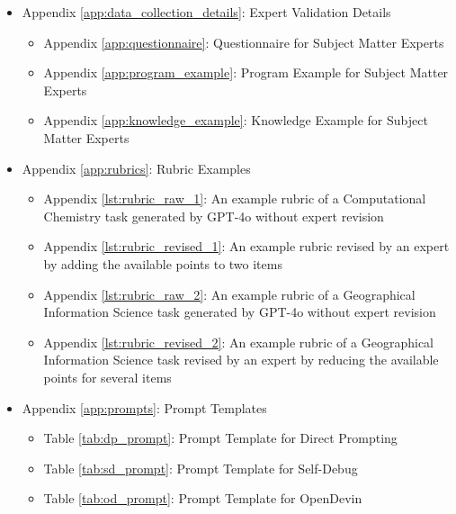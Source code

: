 \begin{itemize}
    \item Appendix \ref{app:data_collection_details}: Expert Validation Details
    \begin{itemize}
        \item Appendix \ref{app:questionnaire}: Questionnaire for Subject Matter Experts
        \item Appendix \ref{app:program_example}: Program Example for Subject Matter Experts
        \item Appendix \ref{app:knowledge_example}: Knowledge Example for Subject Matter Experts \\
    \end{itemize}
    
    \item Appendix \ref{app:rubrics}: Rubric Examples
    \begin{itemize}
        \item Appendix \ref{lst:rubric_raw_1}: An example rubric of a Computational Chemistry task generated by GPT-4o without expert revision
        \item Appendix \ref{lst:rubric_revised_1}: An example rubric revised by an expert by adding the available points to two items
        \item Appendix \ref{lst:rubric_raw_2}: An example rubric of a Geographical Information Science task generated by GPT-4o without expert revision
        \item Appendix \ref{lst:rubric_revised_2}: An example rubric of a Geographical Information Science task revised by an expert by reducing the available points for several items\\
    \end{itemize}
    
    \item Appendix \ref{app:prompts}: Prompt Templates
    \begin{itemize}
        \item Table \ref{tab:dp_prompt}: Prompt Template for Direct Prompting
        \item Table \ref{tab:sd_prompt}: Prompt Template for Self-Debug
        \item Table \ref{tab:od_prompt}: Prompt Template for OpenDevin \\
    \end{itemize}
    

\end{itemize}
